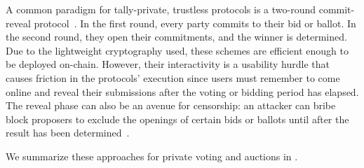 A common paradigm for tally-private, trustless protocols is a two-round commit-reveal protocol~\cite{AUSC:FujOkaOht93,WTSC:GalYou18,CCS:TAFWBM23}. In the first round, every party commits to their bid or ballot. In the second round, they open their commitments, and the winner is determined.
Due to the lightweight cryptography used, these schemes are efficient enough to be deployed on-chain.
However, their interactivity is a usability hurdle that causes friction in the protocols' execution since users must remember to come online and reveal their submissions after the voting or bidding period has elapsed. The reveal phase can also be an avenue for censorship: an attacker can bribe block proposers to exclude the openings of certain bids or ballots until after the result has been determined~\cite{ARXIV:PaiResFox23}.

We summarize these approaches for private voting and auctions in .

